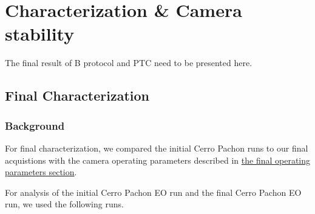 \section{Characterization \& Camera
stability}\label{characterization-camera-stability}

The final result of B protocol and PTC need to be presented here.

\subsection{Final Characterization}\label{final-characterization-1}

\subsubsection{Background}\label{background-2}

For final characterization, we compared the initial Cerro Pachon runs to
our final acquistions with the camera operating parameters described in
\href{https://sitcomtn-148.lsst.io/v/main/index.html\#run-7-final-operating-parameters}{the
final operating parameters section}.

For analysis of the initial Cerro Pachon EO run and the final Cerro
Pachon EO run, we used the following runs.

